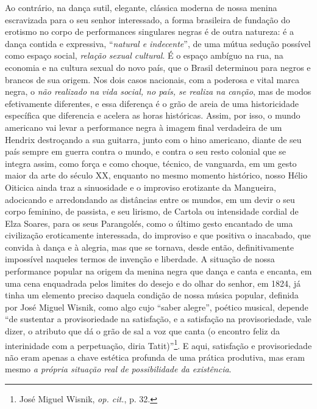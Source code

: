 Ao contrário, na dança sutil, elegante, clássica moderna de nossa menina
escravizada para o seu senhor interessado, a forma brasileira de
fundação do erotismo no corpo de performances singulares negras é de
outra natureza: é a dança contida e expressiva, ``\emph{natural e
indecente}'', de uma mútua sedução possível como espaço social,
\emph{relação sexual cultural}. É o espaço ambíguo na rua, na economia e
na cultura sexual do novo país, que o Brasil determinou para negros e
brancos de sua origem. Nos dois casos nacionais, com a poderosa e vital
marca negra, o \emph{não realizado na vida social, no país, se realiza
na canção}, mas de modos efetivamente diferentes, e essa diferença é o
grão de areia de uma historicidade específica que diferencia e acelera
as horas históricas. Assim, por isso, o mundo americano vai levar a
performance negra à imagem final verdadeira de um Hendrix destroçando a
sua guitarra, junto com o hino americano, diante de seu país sempre em
guerra contra o mundo, e contra o seu resto colonial que se integra
assim, como força e como choque, técnico, de vanguarda, em um gesto
maior da arte do século XX, enquanto no mesmo momento histórico, nosso
Hélio Oiticica ainda traz a sinuosidade e o improviso erotizante da
Mangueira, adocicando e arredondando as distâncias entre os mundos, em
um devir o seu corpo feminino, de passista, e seu lirismo, de Cartola ou
intensidade cordial de Elza Soares, para os seus Parangolés, como o
último gesto encantado de uma civilização eroticamente interessada, do
improviso e que positiva o inacabado, que convida à dança e à alegria,
mas que se tornava, desde então, definitivamente impossível naqueles
termos de invenção e liberdade. A situação de nossa performance popular
na origem da menina negra que dança e canta e encanta, em uma cena
enquadrada pelos limites do desejo e do olhar do senhor, em 1824, já
tinha um elemento preciso daquela condição de nossa música popular,
definida por José Miguel Wisnik, como algo cujo ``saber alegre'',
poético musical, depende ``de sustentar a provisoriedade na satisfação,
e a satisfação na provisoriedade, vale dizer, o atributo que dá o grão
de sal a voz que canta (o encontro feliz da interinidade com a
perpetuação, diria Tatit)''\footnote{José Miguel Wisnik, \emph{op.
  cit.}, p. 32.}. E aqui, satisfação e provisoriedade não eram apenas a
chave estética profunda de uma prática produtiva, mas eram mesmo \emph{a
própria situação real de possibilidade da existência}.

